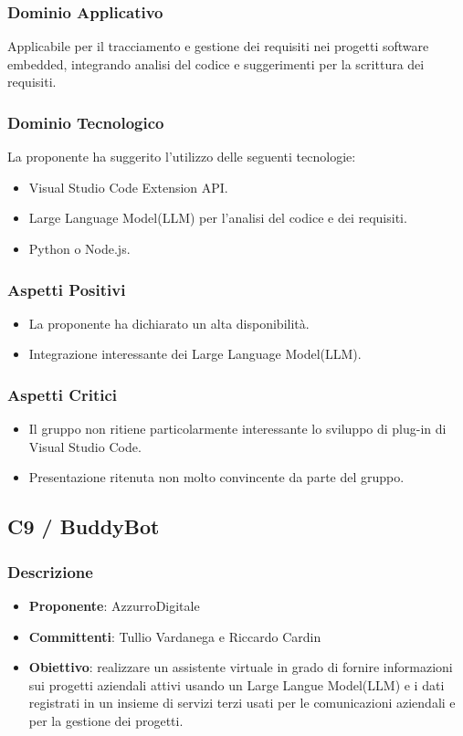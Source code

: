 \documentclass[a4paper, 12pt]{article}
\begin{document}
\subsubsection{Dominio Applicativo}
Applicabile per il tracciamento e gestione dei requisiti nei progetti software embedded, integrando analisi del codice e suggerimenti per la scrittura dei requisiti.

\subsubsection{Dominio Tecnologico}
La proponente ha suggerito l’utilizzo delle seguenti tecnologie:
\begin{itemize}
    \item Visual Studio Code Extension API.
    \item Large Language Model(LLM) per l'analisi del codice e dei requisiti.
    \item Python o Node.js.
\end{itemize}

\subsubsection{Aspetti Positivi}
\begin{itemize}
    \item La proponente ha dichiarato un alta disponibilità.
    \item Integrazione interessante dei Large Language Model(LLM).
\end{itemize}

\subsubsection{Aspetti Critici}
\begin{itemize}
    \item Il gruppo non ritiene particolarmente interessante lo sviluppo di plug-in di Visual Studio Code.
    \item Presentazione ritenuta non molto convincente da parte del gruppo.
\end{itemize}



\subsection{C9 / BuddyBot}

\subsubsection{Descrizione}
\begin{itemize}
    \item \textbf{Proponente}: AzzurroDigitale
    \item \textbf{Committenti}: Tullio Vardanega e Riccardo Cardin
    \item \textbf{Obiettivo}: realizzare un assistente virtuale in grado di fornire informazioni sui progetti aziendali attivi usando un Large Langue Model(LLM) e i dati registrati in un insieme di servizi terzi usati per le comunicazioni aziendali e per la gestione dei progetti.
\end{itemize}
\end{document}
